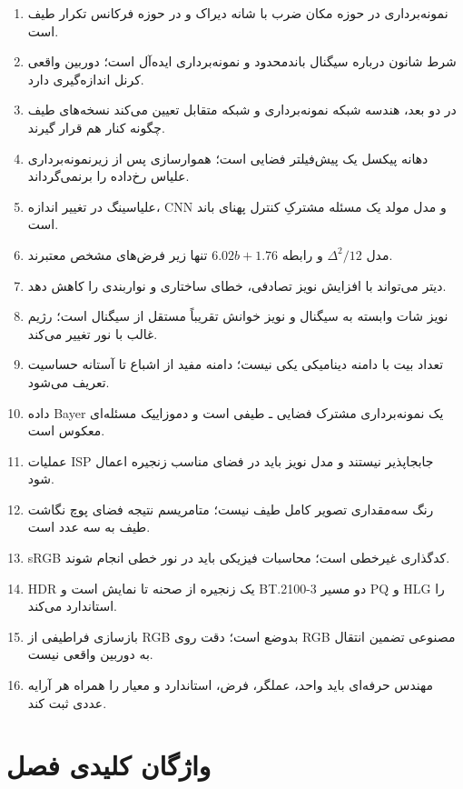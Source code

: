 \begin{enumerate}
\item نمونه‌برداری در حوزه مکان ضرب با شانه دیراک و در حوزه فرکانس تکرار طیف است.
\item شرط شانون درباره سیگنال باند‌محدود و نمونه‌برداری ایده‌آل است؛ دوربین واقعی کرنل اندازه‌گیری دارد.
\item در دو بعد، هندسه شبکه نمونه‌برداری و شبکه متقابل تعیین می‌کند نسخه‌های طیف چگونه کنار هم قرار گیرند.
\item دهانه پیکسل یک پیش‌فیلتر فضایی است؛ هموارسازی پس از زیرنمونه‌برداری علیاس رخ‌داده را برنمی‌گرداند.
\item علیاسینگ در تغییر اندازه، CNN و مدل مولد یک مسئله مشترکِ کنترل پهنای باند است.
\item مدل \(\Delta^2/12\) و رابطه \(6.02b+1.76\) تنها زیر فرض‌های مشخص معتبرند.
\item دیتر می‌تواند با افزایش نویز تصادفی، خطای ساختاری و نواربندی را کاهش دهد.
\item نویز شات وابسته به سیگنال و نویز خوانش تقریباً مستقل از سیگنال است؛ رژیم غالب با نور تغییر می‌کند.
\item تعداد بیت با دامنه دینامیکی یکی نیست؛ دامنه مفید از اشباع تا آستانه حساسیت تعریف می‌شود.
\item داده Bayer یک نمونه‌برداری مشترک فضایی ـ طیفی است و دموزاییک مسئله‌ای معکوس است.
\item عملیات ISP جابجاپذیر نیستند و مدل نویز باید در فضای مناسب زنجیره اعمال شود.
\item رنگ سه‌مقداری تصویر کامل طیف نیست؛ متامریسم نتیجه فضای پوچ نگاشت طیف به سه عدد است.
\item sRGB کدگذاری غیرخطی است؛ محاسبات فیزیکی باید در نور خطی انجام شوند.
\item HDR یک زنجیره از صحنه تا نمایش است و BT.2100-3 دو مسیر PQ و HLG را استاندارد می‌کند.
\item بازسازی فراطیفی از RGB بدوضع است؛ دقت روی RGB مصنوعی تضمین انتقال به دوربین واقعی نیست.
\item مهندس حرفه‌ای باید واحد، عملگر، فرض، استاندارد و معیار را همراه هر آرایه عددی ثبت کند.
\end{enumerate}

\section{واژگان کلیدی فصل}

